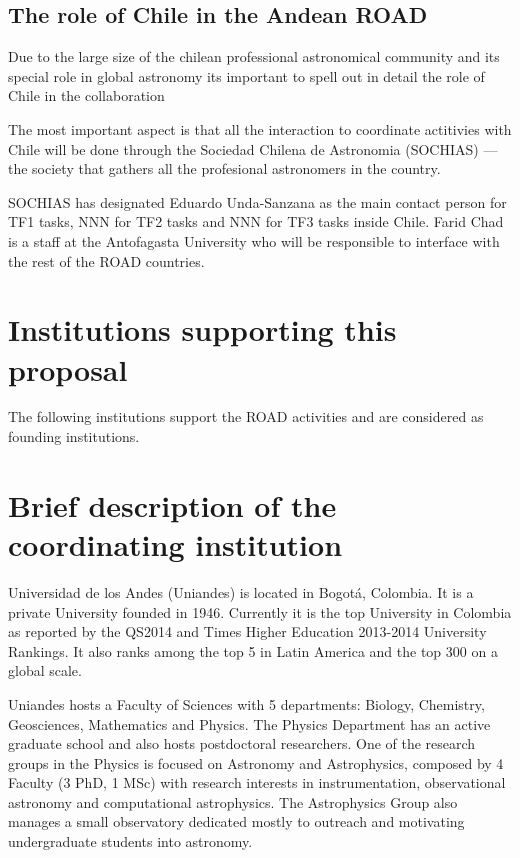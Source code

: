 \documentclass[12pt]{article}
\begin{document}
\subsection*{The role of Chile in the Andean ROAD}

Due to the large size of the chilean professional astronomical
community and its special role in global astronomy its important to
spell out in detail the role of Chile in the collaboration

The most important aspect is that all the interaction to coordinate
actitivies with Chile will be done through the Sociedad Chilena de
Astronomia (SOCHIAS) --- the society that gathers all the profesional
astronomers in the country.

SOCHIAS has designated Eduardo Unda-Sanzana as the main contact
person for TF1 tasks, NNN for TF2 tasks and NNN for TF3 tasks inside
Chile. Farid Chad is a staff at the Antofagasta University who will be
responsible to interface with the rest of the ROAD countries.



\appendixpage
\appendix
\section{Institutions supporting this proposal}

The following institutions support the ROAD activities and are
considered as founding institutions.

\section{Brief description of the coordinating institution}

Universidad de los Andes (Uniandes) is located in Bogotá, Colombia. It
is a private University founded in 1946. Currently it is the top
University in Colombia as reported by the QS2014 and Times
Higher Education 2013-2014 University Rankings. It also ranks among
the top 5 in Latin America and the top 300 on a global scale.    

Uniandes hosts a Faculty of Sciences with 5 departments: Biology,
Chemistry, Geosciences, Mathematics and Physics. The Physics
Department has an active graduate school and also hosts postdoctoral
researchers. One of the research groups in the Physics is focused on
Astronomy and Astrophysics, composed by 4 Faculty (3 PhD, 1 MSc) with
research interests in instrumentation, observational astronomy and
computational astrophysics. The Astrophysics Group also manages a
small observatory dedicated mostly to outreach and motivating
undergraduate students into astronomy. 
\end{document}
